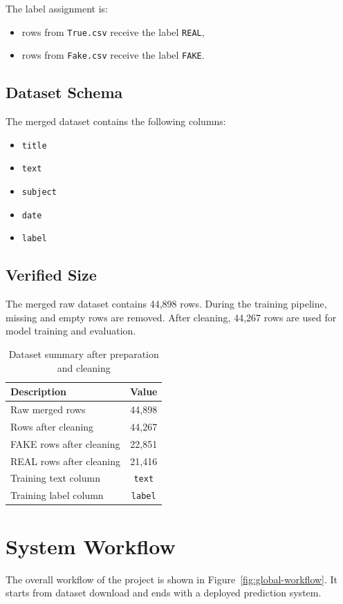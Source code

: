 \documentclass[12pt,a4paper]{article}
\begin{document}
The label assignment is:
\begin{itemize}[leftmargin=*]
\item rows from \texttt{True.csv} receive the label \texttt{REAL},
\item rows from \texttt{Fake.csv} receive the label \texttt{FAKE}.
\end{itemize}

\subsection{Dataset Schema}
The merged dataset contains the following columns:
\begin{itemize}[leftmargin=*]
\item \texttt{title}
\item \texttt{text}
\item \texttt{subject}
\item \texttt{date}
\item \texttt{label}
\end{itemize}

\subsection{Verified Size}
The merged raw dataset contains 44,898 rows. During the training pipeline, missing and empty rows are removed. After cleaning, 44,267 rows are used for model training and evaluation.

\begin{table}[H]
\centering
\caption{Dataset summary after preparation and cleaning}
\begin{tabular}{lc}
\toprule
Description & Value \\
\midrule
Raw merged rows & 44,898 \\
Rows after cleaning & 44,267 \\
FAKE rows after cleaning & 22,851 \\
REAL rows after cleaning & 21,416 \\
Training text column & \texttt{text} \\
Training label column & \texttt{label} \\
\bottomrule
\end{tabular}
\end{table}

\section{System Workflow}
The overall workflow of the project is shown in Figure~\ref{fig:global-workflow}. It starts from dataset download and ends with a deployed prediction system.
\end{document}
